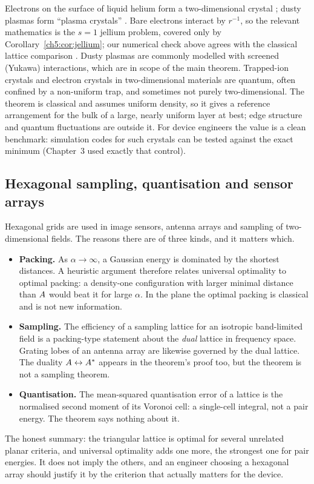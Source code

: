 Electrons on the surface of liquid helium form a two-dimensional crystal \cite{grimes}; dusty plasmas form
``plasma crystals'' \cite{thomas}. Bare electrons interact by $r^{-1}$, so the relevant mathematics is the $s=1$
jellium problem, covered only by Corollary~\ref{ch5:cor:jellium}; our numerical check above agrees with the classical
lattice comparison \cite{bm,alves}. Dusty plasmas are commonly modelled with screened (Yukawa) interactions, which
are in scope of the main theorem. Trapped-ion crystals and electron crystals in two-dimensional materials are
quantum, often confined by a non-uniform trap, and sometimes not purely two-dimensional. The theorem is classical
and assumes uniform density, so it gives a reference arrangement for the bulk of a large, nearly uniform layer at
best; edge structure and quantum fluctuations are outside it. For device engineers the value is a clean benchmark:
simulation codes for such crystals can be tested against the exact minimum (Chapter~3 used exactly that control).

\subsection{Hexagonal sampling, quantisation and sensor arrays}

Hexagonal grids are used in image sensors, antenna arrays and sampling of two-dimensional fields. The reasons there
are of three kinds, and it matters which.
\begin{itemize}[leftmargin=*]
\item \textbf{Packing.} As $\alpha\to\infty$, a Gaussian energy is dominated by the shortest distances. A heuristic
  argument therefore relates universal optimality to optimal packing: a density-one configuration with larger
  minimal distance than $A$ would beat it for large $\alpha$. In the plane the optimal packing is classical and
  is not new information.
\item \textbf{Sampling.} The efficiency of a sampling lattice for an isotropic band-limited field is a packing-type
  statement about the \emph{dual} lattice in frequency space. Grating lobes of an antenna array are likewise governed
  by the dual lattice. The duality $A\leftrightarrow A^*$ appears in the theorem's proof too, but the theorem is not
  a sampling theorem.
\item \textbf{Quantisation.} The mean-squared quantisation error of a lattice is the normalised second moment of its
  Voronoi cell: a single-cell integral, not a pair energy. The theorem says nothing about it.
\end{itemize}
The honest summary: the triangular lattice is optimal for several unrelated planar criteria, and universal
optimality adds one more, the strongest one for pair energies. It does not imply the others, and an engineer
choosing a hexagonal array should justify it by the criterion that actually matters for the device.


